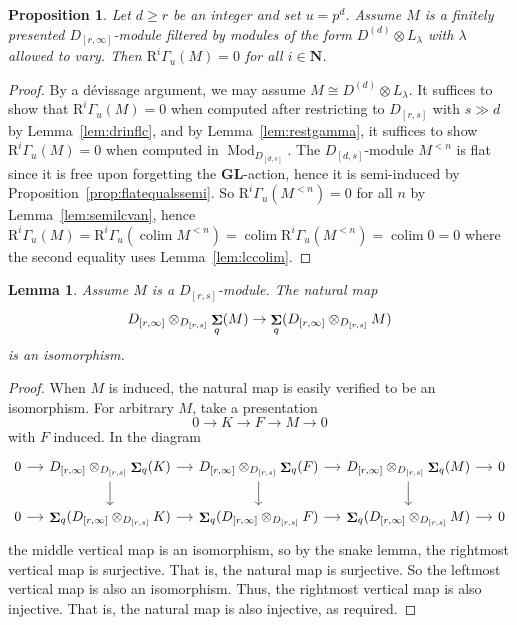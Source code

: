 \documentclass[12pt]{amsart}
\newcommand{\bN}{\mathbf{N}}
\newcommand{\rR}{\mathrm{R}}
\DeclareMathOperator{\Mod}{Mod}
\DeclareMathOperator{\Sh}{\bf{\Sigma}}
\DeclareMathOperator{\colim}{colim}
\newcommand{\Drs}{D_{[r,s]}}
\newcommand{\Drinfty}{D_{[r,\infty]}}
\newcommand{\mShq}{\Sh_{q}}
\newcommand{\GL}{\mathbf{GL}}
\newcommand{\mGau}{\Gamma_{u}}
\numberwithin{equation}{section}
\newtheorem{proposition}[equation]{Proposition}
\newtheorem{lemma}[equation]{Lemma}
\theoremstyle{definition}
\theoremstyle{plain}
\begin{document}
 \begin{proposition}\label{prop:Drlcvanishing}
  Let $d \geq r$ be an integer and set $u = p^{d}$. Assume $M$ is a finitely presented $\Drinfty$-module filtered by modules of the form $D^{(d)} \otimes L_{\lambda}$ with $\lambda$ allowed to vary. Then $\rR^i \mGau(M) = 0$ for all $i \in \bN$.
 \end{proposition}
 \begin{proof}
     By a d\'evissage argument, we may assume $M \cong D^{(d)} \otimes L_{\lambda}$.
     It suffices to show that $\rR^i \mGau(M) = 0$ when computed after restricting to $\Drs$ with $s \gg d$ by Lemma~\ref{lem:drinflc}, and by Lemma~\ref{lem:restgamma}, it suffices to show $\rR^i \mGau(M) = 0$ when computed in $\Mod_{D_{[d,s]}}$. 
     The $D_{[d,s]}$-module $M^{<n}$ is flat since it is free upon forgetting the $\GL$-action, hence it is semi-induced by Proposition~\ref{prop:flatequalssemi}. So $\rR^i\mGau(M^{<n}) = 0$ for all $n$ by Lemma~\ref{lem:semilcvan}, hence $\rR^i\mGau(M) = \rR^i\mGau(\colim M^{<n}) = \colim \rR^i \mGau(M^{<n}) = \colim 0 = 0$ where the second equality uses Lemma~\ref{lem:lccolim}. 
 \end{proof}



\begin{lemma}\label{lem:inducedbasechange}
    Assume $M$ is a $\Drs$-module. The natural map 
    $$\Drinfty \otimes_{\Drs} \mShq(M) \to \mShq(\Drinfty \otimes_{\Drs} M)$$ 
    is an isomorphism. 
\end{lemma}
\begin{proof}
When $M$ is induced, the natural map is easily verified to be an isomorphism. For arbitrary $M$, take a presentation
\[
0 \to K \to F \to M \to 0
\]
with $F$ induced. In the diagram
\[
\begin{tikzcd}[column sep=small]
    0 \arrow[r] & \Drinfty \otimes_{\Drs} \mShq(K) \arrow[d] \arrow[r] & \Drinfty \otimes_{\Drs} \mShq(F) \arrow[d] \arrow[r] &  \Drinfty \otimes_{\Drs} \mShq(M) \arrow[d] \arrow[r] & 0 \\
    0 \arrow[r] & \mShq(\Drinfty \otimes_{\Drs} K)  \arrow[r] & \mShq(\Drinfty \otimes_{\Drs} F) \arrow[r] &  \mShq(\Drinfty \otimes_{\Drs} M) \arrow[r] & 0 
\end{tikzcd}
\]
the middle vertical map is an isomorphism, so by the snake lemma, the rightmost vertical map is surjective. That is, the natural map is surjective. So the leftmost vertical map is also an isomorphism. Thus, the rightmost vertical map is also injective. That is, the natural map is also injective, as required.
\end{proof}
\end{document}
